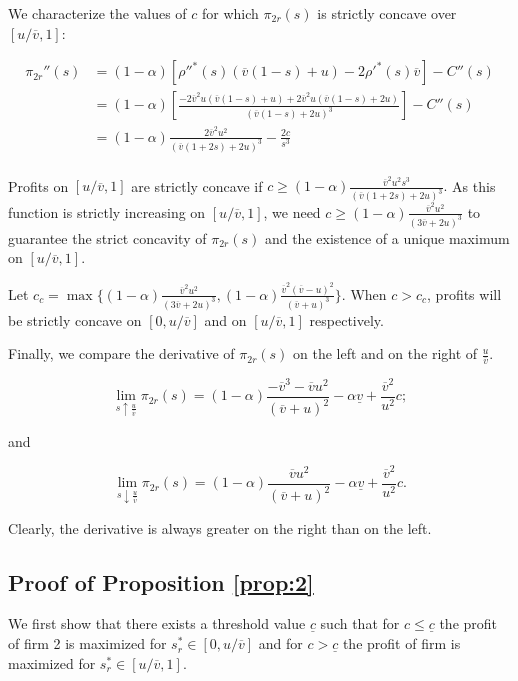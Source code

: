 \documentclass[a4paper,leqno]{article}%
\renewcommand{\a}{\alpha}
\newcommand{\uv}{\underline{v}}
\newcommand{\ov}{\overline{v}}
\begin{document}
We characterize the values of $c$ for which $\pi_{2r}(s)$ is strictly concave over $[u/\ov,1]$:

\begin{equation}
    \begin{aligned}
\pi_{2r}''(s)&=(1-\a)\left[\rho''^{*}(s)(\ov(1-s)+u)-2\rho'^*(s)\ov\right]-C''(s)\\
            &= (1-\a)\left[\frac{-2\ov^2u(\ov(1-s)+u)+2\ov^2u(\ov(1-s)+2u)}{(\ov(1-s)+2u)^3}\right]-C''(s)\\
            &= (1-\a)\frac{2\ov^2u^2}{(\ov(1+2s)+2u)^3}-\frac{2c}{s^3}\\
    \end{aligned}
\end{equation}


Profits on $[u/\ov,1]$ are strictly concave if 
$c\geq (1-\a)\frac{\ov^2u^2s^3}{(\ov(1+2s)+2u)^3}.$ As this function is strictly increasing on $[u/\ov,1]$, we need $c\geq (1-\a)\frac{\ov^2u^2}{(3\ov+2u)^3}$ to guarantee the strict concavity of $\pi_{2r}(s)$ and the existence of a unique maximum on $[u/\ov,1]$.

Let $c_{c}=\max\{(1-\a)\frac{\ov^2u^2}{(3\ov+2u)^3},(1-\a)\frac{\ov^2(\ov-u)^2}{(\ov+u)^3}\}$. When $c>c_c$, profits will be strictly concave on $[0,u/\ov]$ and on $[u/\ov,1]$ respectively.


\medskip

Finally, we compare the derivative of $\pi_{2r}(s)$ on the left and on the right of $\frac{u}{\ov}$. 

$$\lim_{s\uparrow\frac{u}{\ov}} \pi_{2r}(s)=(1-\a)\frac{-\ov^3-\ov u^2}{(\ov+u)^2}-\a \uv+\frac{\ov^2}{u^2}c;$$

and 

$$\lim_{s\downarrow\frac{u}{\ov}} \pi_{2r}(s)=(1-\a)\frac{\ov u^2}{(\ov+u)^2}-\a\uv+\frac{\ov^2}{u^2}c.$$

Clearly, the derivative is always greater on the right than on the left.

\medskip

\subsection{Proof of Proposition \ref{prop:2}}\label{prop:2p}

We first show that there exists a threshold value $\underline{c}$ such that for $c\leq\underline{c}$ the profit of firm 2 is maximized for $s_r^*\in[0,u/\ov]$ and for $c>\underline{c}$ the profit of firm is maximized for $s_r^*\in[u/\ov,1]$.
\end{document}
